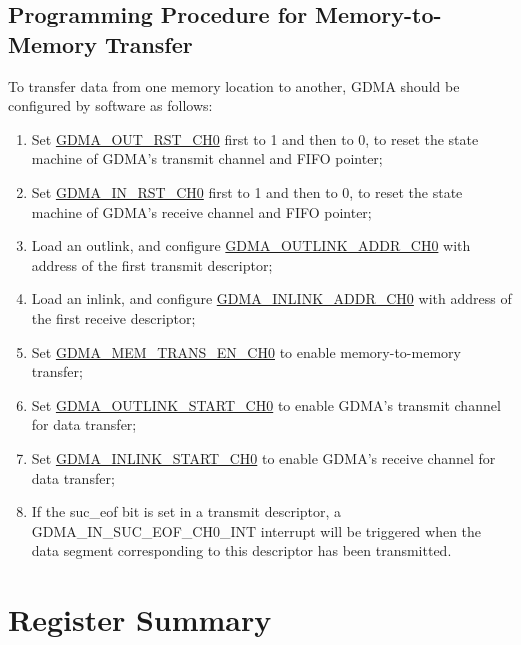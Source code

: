 \documentclass[main\_\_EN.tex]{subfiles}
\begin{document}
\subsection{Programming Procedure for Memory-to-Memory Transfer}\label{tx-rx-program}
To transfer data from one memory location to another, GDMA should be configured by software as follows:
\begin{enumerate}
    \item Set \hyperref[fielddesc:GDMAOUTRSTCH0]{GDMA\_OUT\_RST\_CH0} first to 1 and then to 0, to reset the state machine of GDMA's transmit channel and FIFO pointer;
    \item Set \hyperref[fielddesc:GDMAINRSTCH0]{GDMA\_IN\_RST\_CH0} first to 1 and then to 0, to reset the state machine of GDMA's receive channel and FIFO pointer;
    \item Load an outlink, and configure \hyperref[fielddesc:GDMAOUTLINKADDRCH0]{GDMA\_OUTLINK\_ADDR\_CH0} with address of the first transmit descriptor;
    \item Load an inlink, and configure \hyperref[fielddesc:GDMAINLINKADDRCH0]{GDMA\_INLINK\_ADDR\_CH0} with address of the first receive descriptor;
    \item Set \hyperref[fielddesc:GDMAMEMTRANSENCH0]{GDMA\_MEM\_TRANS\_EN\_CH0} to enable memory-to-memory transfer;
    \item Set \hyperref[fielddesc:GDMAOUTLINKSTARTCH0]{GDMA\_OUTLINK\_START\_CH0} to enable GDMA's transmit channel for data transfer;
    \item Set \hyperref[fielddesc:GDMAINLINKSTARTCH0]{GDMA\_INLINK\_START\_CH0} to enable GDMA's receive channel for data transfer;
    \item If the suc\_eof bit is set in a transmit descriptor, a  GDMA\_IN\_SUC\_EOF\_CH0\_INT interrupt will be triggered when the data segment corresponding to this descriptor has been transmitted.
\end{enumerate}





\clearpage
\hypertarget{dma-reg-summ}{}
\section{Register Summary}
\label{sec:dma-reg-summ}
\end{document}
